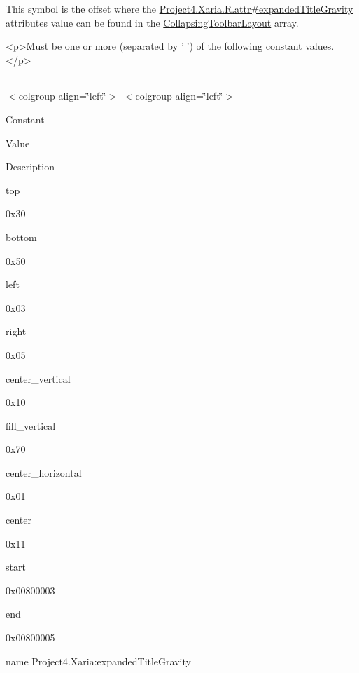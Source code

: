 This symbol is the offset where the \hyperlink{}{Project4.\+Xaria.\+R.\+attr\#expanded\+Title\+Gravity} attribute\textquotesingle{}s value can be found in the \hyperlink{classproject4_1_1xaria_1_1R_1_1styleable_ac131ed2b7e0e7f05b58231242478b839}{Collapsing\+Toolbar\+Layout} array.

\begin{DoxyVerb}      <p>Must be one or more (separated by '|') of the following constant values.</p>
\end{DoxyVerb}
 \tabulinesep=1mm
\begin{longtabu} spread 0pt [c]{*{0}{|X[-1]}|}
\hline
\end{longtabu}
$<$colgroup align=\char`\"{}left\char`\"{}$>$ $<$colgroup align=\char`\"{}left\char`\"{}$>$ 

Constant

Value

Description 

{\ttfamily top}

0x30

{\ttfamily bottom}

0x50

{\ttfamily left}

0x03

{\ttfamily right}

0x05

{\ttfamily center\+\_\+vertical}

0x10

{\ttfamily fill\+\_\+vertical}

0x70

{\ttfamily center\+\_\+horizontal}

0x01

{\ttfamily center}

0x11

{\ttfamily start}

0x00800003

{\ttfamily end}

0x00800005

name Project4.\+Xaria\+:expanded\+Title\+Gravity \mbox{\label{classproject4_1_1xaria_1_1R_1_1styleable_a32e897c7aed6567462eb91ece9f149d4}} 
